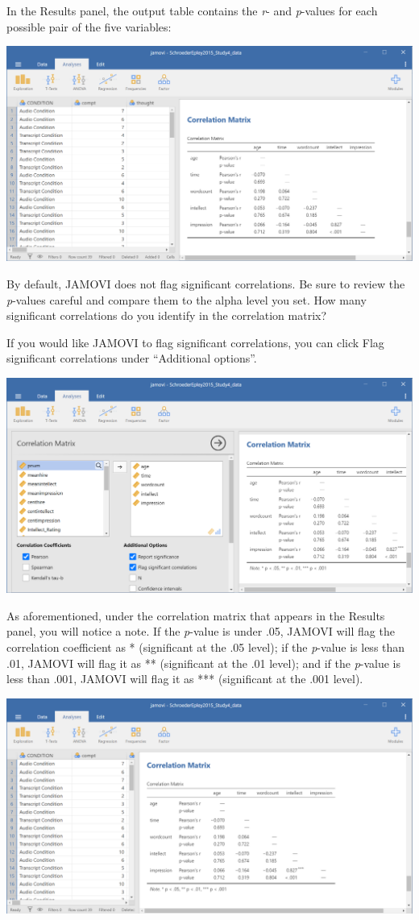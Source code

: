 \documentclass[
]{book}
\begin{document}
In the Results panel, the output table contains the \emph{r}- and \emph{p}-values for each possible pair of the five variables:

\includegraphics{img/7.4.65.png}

By default, JAMOVI does not flag significant correlations. Be sure to review the \emph{p}-values careful and compare them to the alpha level you set. How many significant correlations do you identify in the correlation matrix?

If you would like JAMOVI to flag significant correlations, you can click {Flag significant correlations} under ``Additional options''.

\includegraphics{img/7.4.66.png}

As aforementioned, under the correlation matrix that appears in the Results panel, you will notice a note. If the \emph{p}-value is under .05, JAMOVI will flag the correlation coefficient as * (significant at the .05 level); if the \emph{p}-value is less than .01, JAMOVI will flag it as ** (significant at the .01 level); and if the \emph{p}-value is less than .001, JAMOVI will flag it as *** (significant at the .001 level).

\includegraphics{img/7.4.67.png}
\end{document}
